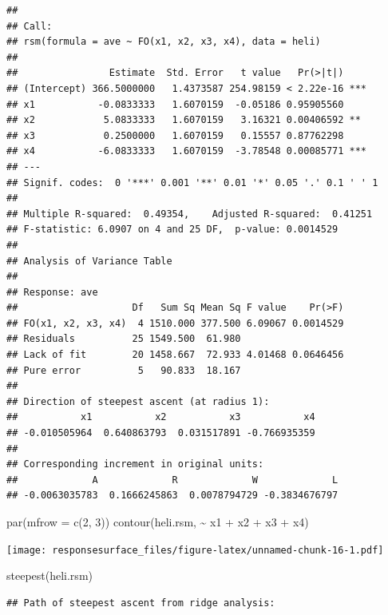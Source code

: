 \documentclass[
]{book}
\newenvironment{Shaded}{\begin{snugshade}}{\end{snugshade}}
\newcommand{\AttributeTok}[1]{\textcolor[rgb]{0.77,0.63,0.00}{#1}}
\newcommand{\DecValTok}[1]{\textcolor[rgb]{0.00,0.00,0.81}{#1}}
\newcommand{\FunctionTok}[1]{\textcolor[rgb]{0.00,0.00,0.00}{#1}}
\newcommand{\NormalTok}[1]{#1}
\newcommand{\SpecialCharTok}[1]{\textcolor[rgb]{0.00,0.00,0.00}{#1}}
\theoremstyle{definition}
\theoremstyle{definition}
\theoremstyle{definition}
\theoremstyle{definition}
\theoremstyle{remark}
\begin{document}
\begin{verbatim}
## 
## Call:
## rsm(formula = ave ~ FO(x1, x2, x3, x4), data = heli)
## 
##                Estimate  Std. Error   t value   Pr(>|t|)    
## (Intercept) 366.5000000   1.4373587 254.98159 < 2.22e-16 ***
## x1           -0.0833333   1.6070159  -0.05186 0.95905560    
## x2            5.0833333   1.6070159   3.16321 0.00406592 ** 
## x3            0.2500000   1.6070159   0.15557 0.87762298    
## x4           -6.0833333   1.6070159  -3.78548 0.00085771 ***
## ---
## Signif. codes:  0 '***' 0.001 '**' 0.01 '*' 0.05 '.' 0.1 ' ' 1
## 
## Multiple R-squared:  0.49354,    Adjusted R-squared:  0.41251 
## F-statistic: 6.0907 on 4 and 25 DF,  p-value: 0.0014529
## 
## Analysis of Variance Table
## 
## Response: ave
##                    Df   Sum Sq Mean Sq F value    Pr(>F)
## FO(x1, x2, x3, x4)  4 1510.000 377.500 6.09067 0.0014529
## Residuals          25 1549.500  61.980                  
## Lack of fit        20 1458.667  72.933 4.01468 0.0646456
## Pure error          5   90.833  18.167                  
## 
## Direction of steepest ascent (at radius 1):
##           x1           x2           x3           x4 
## -0.010505964  0.640863793  0.031517891 -0.766935359 
## 
## Corresponding increment in original units:
##             A             R             W             L 
## -0.0063035783  0.1666245863  0.0078794729 -0.3834676797
\end{verbatim}

\begin{Shaded}
\begin{Highlighting}[]
 \FunctionTok{par}\NormalTok{(}\AttributeTok{mfrow =} \FunctionTok{c}\NormalTok{(}\DecValTok{2}\NormalTok{, }\DecValTok{3}\NormalTok{))}
\FunctionTok{contour}\NormalTok{(heli.rsm, }\SpecialCharTok{\textasciitilde{}}\NormalTok{ x1 }\SpecialCharTok{+}\NormalTok{ x2 }\SpecialCharTok{+}\NormalTok{ x3 }\SpecialCharTok{+}\NormalTok{ x4)}
\end{Highlighting}
\end{Shaded}

\texttt{[image: responsesurface\_files/figure-latex/unnamed-chunk-16-1.pdf]}

\begin{Shaded}
\begin{Highlighting}[]
\FunctionTok{steepest}\NormalTok{(heli.rsm)}
\end{Highlighting}
\end{Shaded}

\begin{verbatim}
## Path of steepest ascent from ridge analysis:
\end{verbatim}
\end{document}
